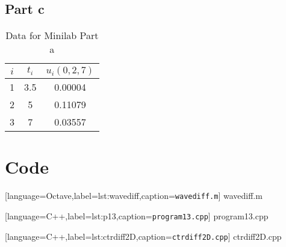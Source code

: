 \documentclass[12pt]{article}
\begin{document}
\subsection{Part c}
\begin{table}[H]
  \centering
  \begin{tabular}[H]{ccc}
    \hline
    $i$ & $t_i$ & $u_i(0,2,7)$ \\
    \hline
    1 & 3.5 & 0.00004 \\
    2 & 5   & 0.11079 \\
    3 & 7   & 0.03557 \\
    \hline
  \end{tabular}
  \caption{Data for Minilab Part a}
  \label{tab:mini_b}
\end{table}

\pagebreak
\section{Code}

[language=Octave,label=lst:wavediff,caption=\texttt{wavediff.m}]
{wavediff.m}
\pagebreak

[language=C++,label=lst:p13,caption=\texttt{program13.cpp}]
{program13.cpp}
\pagebreak

[language=C++,label=lst:ctrdiff2D,caption=\texttt{ctrdiff2D.cpp}]
{ctrdiff2D.cpp}
\end{document}
